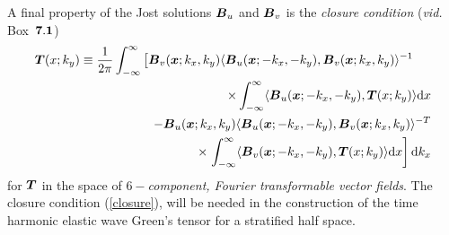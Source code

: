 A final property of the Jost solutions  ${\mbox{\boldmath$\mit B$\unboldmath}}_{u}$ and ${\mbox{\boldmath$\mit B$\unboldmath}}_{v}$ is the {\em closure condition\/} ({\em vid.\/} {\sc  Box}~$\bf 7.1$)
\begin{eqnarray} \label{closure}
\lefteqn{{\bmi  T}({ x};k_y) \equiv
\frac{1}{2 \pi}\int_{-\infty}^{\infty} \left[{\bmi B}_{ v}({\bmi x};k_{x},k_{y}) \langle{  
{\bmi B}_{u}({\bmi x};-k_{x},-k_{y}),  {\bmi B}_{v}({\bmi x};k_{x},k_{y})
}\rangle^{-1} \right.}\nonumber\\
&&\qquad\qquad\qquad\qquad\qquad\qquad\times \int_{-\infty}^{\infty} \langle{  
{\bmi B}_{u}({\bmi x};-k_{x},-k_{y}),  {\bmi  T}({ x};k_y)
}\rangle {\rm d}x \nonumber\\
&&- 
{\bmi B}_{ u} ({\bmi x};k_{x},k_{y}) \langle{  
{\bmi B}_{u}({\bmi x};-k_{x},-k_{y}),  
{\bmi B}_{v}({\bmi x};k_{x},k_{y})
}\rangle^{-T}\nonumber\\
&&\qquad\qquad\qquad\qquad\qquad\qquad\times \left.
\int_{-\infty}^{\infty} \langle{ {\bmi B}_{v}({\bmi x};-k_{x},-k_{y}),  
{\bmi  T}({ x};k_y)}\rangle {\rm d}x\right]{\rm d}k_x
\end{eqnarray}
for ${\mbox{\boldmath$\mit T$\unboldmath}}$ in the space of {\em $6-$component,  Fourier transformable 
vector fields\/}.
The closure condition (\ref{closure}), 
will be needed in the construction of the time harmonic elastic wave 
Green's tensor for a stratified half space.
